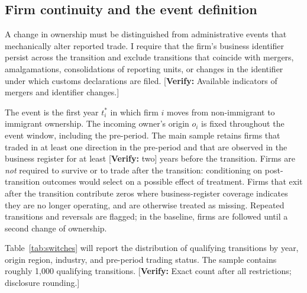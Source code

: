 \documentclass[12pt]{article}
\theoremstyle{remark}
\newcommand{\verify}[1]{\textcolor{BrickRed}{[\textbf{Verify:} #1]}}
\begin{document}
\subsection{Firm continuity and the event definition}

A change in ownership must be distinguished from administrative events that
mechanically alter reported trade. I require that the firm's business
identifier persist across the transition and exclude transitions that coincide
with mergers, amalgamations, consolidations of reporting units, or changes in
the identifier under which customs declarations are filed. \verify{Available
indicators of mergers and identifier changes.}

The event is the first year $t_i^*$ in which firm $i$ moves from non-immigrant
to immigrant ownership. The incoming owner's origin $o_i$ is fixed throughout
the event window, including the pre-period. The main sample retains firms that
traded in at least one direction in the pre-period and that are observed in
the business register for at least \verify{two} years before the transition.
Firms are \emph{not} required to survive or to trade after the transition:
conditioning on post-transition outcomes would select on a possible effect of
treatment. Firms that exit after the transition contribute zeros where
business-register coverage indicates they are no longer operating, and are
otherwise treated as missing. Repeated transitions and reversals are flagged;
in the baseline, firms are followed until a second change of ownership.

Table~\ref{tab:switches} will report the distribution of qualifying
transitions by year, origin region, industry, and pre-period trading status.
The sample contains roughly 1,000 qualifying transitions. \verify{Exact count
after all restrictions; disclosure rounding.}
\end{document}
